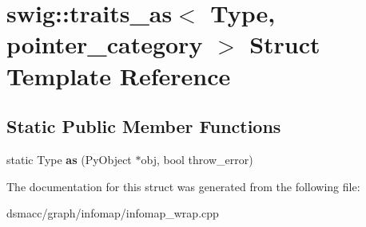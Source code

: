 \hypertarget{structswig_1_1traits__as_3_01Type_00_01pointer__category_01_4}{}\section{swig\+:\+:traits\+\_\+as$<$ Type, pointer\+\_\+category $>$ Struct Template Reference}
\label{structswig_1_1traits__as_3_01Type_00_01pointer__category_01_4}
\subsection*{Static Public Member Functions}
\begin{DoxyCompactItemize}
\item 
\mbox{\label{structswig_1_1traits__as_3_01Type_00_01pointer__category_01_4_af4d6146e7890c389c1a8c87ff57a0366}} 
static Type {\bfseries as} (Py\+Object $\ast$obj, bool throw\+\_\+error)
\end{DoxyCompactItemize}


The documentation for this struct was generated from the following file\+:\begin{DoxyCompactItemize}
\item 
dsmacc/graph/infomap/infomap\+\_\+wrap.\+cpp\end{DoxyCompactItemize}
